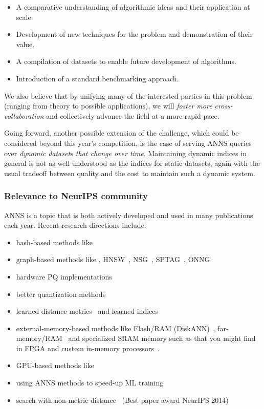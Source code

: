 \begin{itemize}
	\item A comparative understanding of algorithmic ideas and their
	application at scale.
	\item Development of new techniques for the problem and demonstration
	of their value.
	\item A compilation of datasets to enable future development of algorithms.
  \item Introduction of a standard benchmarking approach.
\end{itemize}

We also believe that by unifying many of the interested parties in
this problem (ranging from theory to possible applications), we will
\emph{foster more cross-collaboration} and collectively advance the
field at a more rapid pace.  

Going forward, another possible extension
of the challenge, which could be considered beyond this year's
competition, is the case of serving ANNS queries over \emph{dynamic
  datasets that change over time}. Maintaining dynamic indices in
general is not as well understood as the indices for static datasets,
again with the usual tradeoff between quality and the cost to maintain
such a dynamic system.

\subsubsection{Relevance to NeurIPS community}

ANNS is a topic that is both actively developed and used in many publications each year.
Recent research directions include:
\begin{itemize}
\item
     hash-based methods like \cite{kulis2009learning}
\item
	 graph-based methods like \cite{WangL12, WangWZTGL12}, HNSW~\cite{HNSW16}, NSG~\cite{NSG17}, SPTAG~\cite{ChenW18}, ONNG~\cite{onng}
\item 
	hardware PQ implementations~\cite{Andre_2019}
\item
	better quantization methods~\cite{scann}
\item 
	learned distance metrics~\cite{sablayrolles2019spreading,baranchuk2019learning} and learned indices~\cite{DBLP:conf/iclr/DongIRW20}
\item 
 	external-memory-based methods like Flash/RAM (DiskANN)~\cite{DiskANN19}, far-memory/RAM~\cite{hm-ann20} and specialized SRAM memory such as that you might find in 
FPGA and custom in-memory processors~\cite{10.1007/978-3-030-27562-4_27,ZhangJialiang}.
\item
	GPU-based methods like~\cite{Faiss17,DBLP:conf/sigmod/WangSWR18,groh2019ggnn}
\item using ANNS methods to speed-up ML training~\cite{DBLP:conf/mlsys/ChenMFGTS20, chen2021mongoose}

\item search with non-metric distance~\cite{Shrivastava014} (Best paper award NeurIPS 2014)
\end{itemize}

